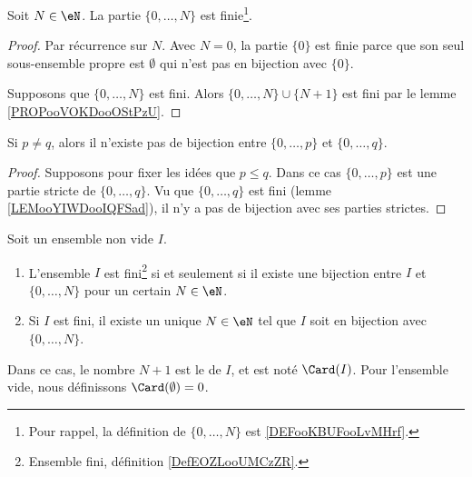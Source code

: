 \begin{lemma}       \label{LEMooYIWDooIQFSad}
	Soit \( N\in \eN\). La partie \( \{ 0,\ldots, N \}\) est finie\footnote{Pour rappel, la définition de \( \{ 0,\ldots, N \}\) est \ref{DEFooKBUFooLvMHrf}.}.
\end{lemma}

\begin{proof}
	Par récurrence sur \( N\). Avec \( N=0\), la partie \( \{ 0 \}\) est finie parce que son seul sous-ensemble propre est \( \emptyset\) qui n'est pas en bijection avec \( \{ 0 \}\).

	Supposons que \( \{ 0,\ldots, N \}\) est fini. Alors \( \{ 0,\ldots, N \}\cup \{ N+1 \}\) est fini par le lemme \ref{PROPooVOKDooOStPzU}.
\end{proof}

\begin{lemma}       \label{LEMooJDGOooHdyJnu}
	Si \( p\neq q\), alors il n'existe pas de bijection entre \( \{ 0,\ldots, p \}\) et \( \{ 0,\ldots, q \}\).
\end{lemma}

\begin{proof}
	Supposons pour fixer les idées que \( p\leq q\). Dans ce cas \( \{ 0,\ldots, p \}\) est une partie stricte de \( \{ 0,\ldots, q \}\). Vu que \( \{ 0,\ldots, q \}\) est fini (lemme \ref{LEMooYIWDooIQFSad}), il n'y a pas de bijection avec ses parties strictes.
\end{proof}




\begin{propositionDef}     \label{PROPooJLGKooDCcnWi}
	Soit un ensemble non vide \( I\).
	\begin{enumerate}
		\item   \label{ITEMooMNMTooEOIjdo}
		      L'ensemble \( I\) est fini\footnote{Ensemble fini, définition \ref{DefEOZLooUMCzZR}.} si et seulement si il existe une bijection entre \( I\) et \( \{ 0,\ldots, N \}\) pour un certain \( N\in \eN\).
		\item   \label{ITEMooZJFUooSNUSIk}
		      Si \( I\) est fini, il existe un unique \( N\in \eN\) tel que \( I\) soit en bijection avec \( \{ 0,\ldots, N \}\).
	\end{enumerate}
	Dans ce cas, le nombre \( N+1\) est le  de \( I\), et est noté \( \Card(I)\). Pour l'ensemble vide, nous définissons \( \Card(\emptyset)=0\).
\end{propositionDef}

